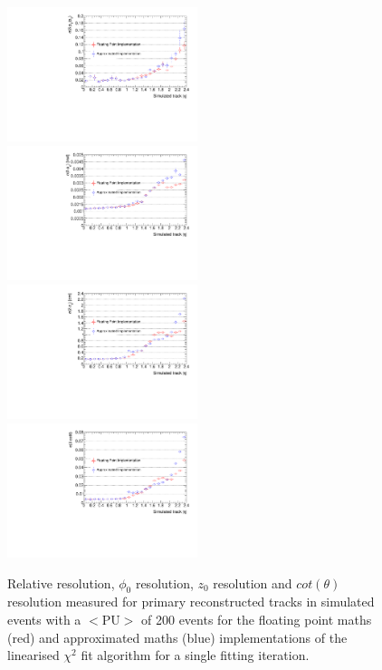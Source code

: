 \begin{figure}[htb]
\centering
\includegraphics[width=0.495\textwidth]{figs/tk-upgrade/results-chi2fitter/ptRelResVsEta_It_1_ApproxVsExact.pdf}
\includegraphics[width=0.495\textwidth]{figs/tk-upgrade/results-chi2fitter/phi0ResVsEta_It_1_ApproxVsExact.pdf}
\\
\includegraphics[width=0.495\textwidth]{figs/tk-upgrade/results-chi2fitter/z0ResVsEta_It_1_ApproxVsExact.pdf}
\includegraphics[width=0.495\textwidth]{figs/tk-upgrade/results-chi2fitter/cotThetaResVsEta_It_1_ApproxVsExact.pdf}
\caption{
Relative \pt resolution, $\phi_{0}$ resolution, $z_{0}$ resolution and $cot(\theta)$ resolution measured for primary reconstructed tracks in simulated \ttbar events with a $<\textrm{PU}>$ of 200 events for the floating point maths (red) and approximated maths (blue) implementations of the linearised $\chi^{2}$ fit algorithm for a single fitting iteration.
}
\label{fig:chi2HelixParametersResVsEtaApproxVsExact}
\end{figure}

